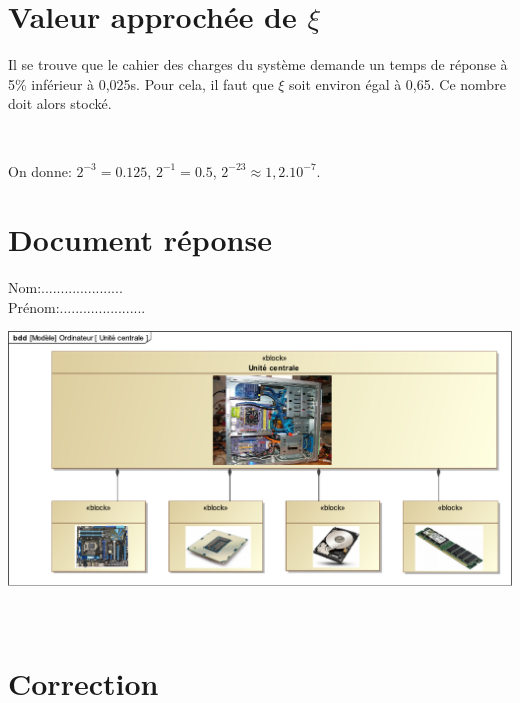 \section{Valeur approchée de $\xi$}

Il se trouve que le cahier des charges du système demande un temps de réponse à 5\% inférieur à 0,025s. Pour cela, il faut que $\xi$ soit environ égal à 0,65. Ce nombre doit alors stocké.



~\

On donne: $2^{-3}=0.125$, $2^{-1}=0.5$, $2^{-23}\approx 1,2.10^{-7}$.


\newpage

\section{Document réponse}

Nom:.....................\\
Prénom:......................

\begin{center}
 \includegraphics[width=0.9\linewidth]{img/unite_centrale_vierge}
\end{center}

\ifdef{\public}{}{}

\newpage

~\

\newpage
\cleardoublepage

\pagestyle{correction}\setcounter{section}{0}

\section{Correction}

